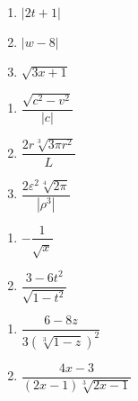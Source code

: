 \documentclass{ximera}
\begin{document}
\begin{multicols}{3}
\begin{enumerate}
\setcounter{enumi}{\value{HW}}

\item  $|2t+1|$

\item  $|w-8|$

\item  $\sqrt{3x+1}$

\setcounter{HW}{\value{enumi}}
\end{enumerate}
\end{multicols}

\begin{multicols}{3}
\begin{enumerate}
\setcounter{enumi}{\value{HW}}

\item $\dfrac{\sqrt{c^2-v^2}}{|c|}$ 

\item $\dfrac{2r \sqrt[3]{3 \pi r^2}}{L}$ 

\item  $\dfrac{2 \varepsilon^2 \sqrt[4]{2\pi}}{|\rho^3|}$ 

\setcounter{HW}{\value{enumi}}
\end{enumerate}
\end{multicols}

\begin{multicols}{2}
\begin{enumerate}
\setcounter{enumi}{\value{HW}}

\item  $-\dfrac{1}{\sqrt{x}}$ 

\item  $\dfrac{3-6t^2}{\sqrt{1-t^2}}$

\setcounter{HW}{\value{enumi}}
\end{enumerate}
\end{multicols}

\begin{multicols}{2}
\begin{enumerate}
\setcounter{enumi}{\value{HW}}

\item  $\dfrac{6-8z}{3 (\sqrt[3]{1-z})^2}$


\item  $\dfrac{4x-3}{(2x-1)\sqrt[3]{2x-1}}$  

\setcounter{HW}{\value{enumi}}
\end{enumerate}
\end{multicols}
\end{document}
